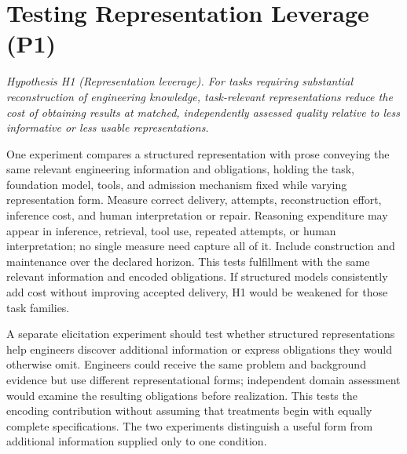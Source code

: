 \section{Testing Representation Leverage (P1)}\label{heading:representation-engineering}

\emph{Hypothesis H1 (Representation leverage). For tasks requiring substantial reconstruction of engineering knowledge, task-relevant representations reduce the cost of obtaining results at matched, independently assessed quality relative to less informative or less usable representations.}


One experiment compares a structured representation with prose conveying the same relevant engineering information and obligations, holding the task, foundation model, tools, and admission mechanism fixed while varying representation form. Measure correct delivery, attempts, reconstruction effort, inference cost, and human interpretation or repair. Reasoning expenditure may appear in inference, retrieval, tool use, repeated attempts, or human interpretation; no single measure need capture all of it. Include construction and maintenance over the declared horizon. This tests fulfillment with the same relevant information and encoded obligations. If structured models consistently add cost without improving accepted delivery, H1 would be weakened for those task families.

A separate elicitation experiment should test whether structured representations help engineers discover additional information or express obligations they would otherwise omit. Engineers could receive the same problem and background evidence but use different representational forms; independent domain assessment would examine the resulting obligations before realization. This tests the encoding contribution without assuming that treatments begin with equally complete specifications. The two experiments distinguish a useful form from additional information supplied only to one condition.


